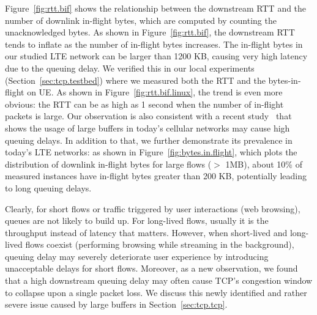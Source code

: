 Figure~\ref{fig:rtt.bif} shows the relationship between the downstream RTT and the number of downlink in-flight bytes, which are computed by counting the unacknowledged bytes. As shown in Figure~\ref{fig:rtt.bif}, the downstream RTT tends to inflate as the number of in-flight bytes increases. The in-flight bytes in our studied LTE network can be larger than 1200 KB, causing very high latency due to the queuing delay. We verified this in our local experiments (Section~\ref{sec:tcp.testbed}) where we measured both the RTT and the bytes-in-flight on UE. As shown in Figure~\ref{fig:rtt.bif.linux}, the trend is even more obvious: the RTT can be as high as 1 second when the number of in-flight packets is large. Our observation is also consistent with a recent study~\cite{jiang12} that shows the usage of large buffers in today's cellular networks may cause high queuing delays. In addition to that, we further demonstrate its prevalence in today's LTE networks: as shown in Figure~\ref{fig:bytes.in.flight}, which plots the distribution of downlink in-flight bytes for large flows ($>$ 1MB), about 10\% of measured instances have in-flight bytes greater than 200 KB, potentially leading to long queuing delays.

Clearly, for short flows or traffic triggered by user interactions (\eg web browsing), queues are not likely to build up. For long-lived flows, usually it is the throughput instead of latency that matters. However, when short-lived and long-lived flows coexist (\eg performing browsing while streaming in the background), queuing delay may severely deteriorate user experience by introducing unacceptable delays for short flows. Moreover, as a new observation, we found that a high downstream queuing delay may often cause TCP's congestion window to collapse upon a single packet loss. We discuss this newly identified and rather severe issue caused by large buffers in Section~\ref{sec:tcp.tcp}.


